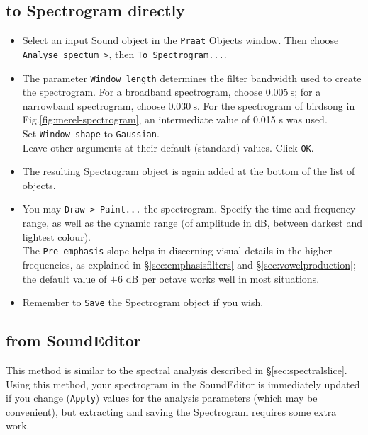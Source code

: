 \documentclass[
]{book}
\begin{document}
\subsection{to Spectrogram directly}\label{to-spectrogram-directly}

\begin{itemize}
\item
  Select an input Sound object in the \texttt{Praat} Objects window. Then choose \texttt{Analyse\ spectum\ \textgreater{}}, then \texttt{To\ Spectrogram...}.
\item
  The parameter \texttt{Window\ length} determines the filter bandwidth used to create the spectrogram. For a broadband spectrogram, choose \(0.005\ \textrm{s}\); for a narrowband spectrogram, choose \(0.030\ \textrm{s}\).
  For the spectrogram of birdsong in Fig.\ref{fig:merel-spectrogram}, an intermediate value of 0.015 s was used.\\
  Set \texttt{Window\ shape} to \texttt{Gaussian}.\\
  Leave other arguments at their default (standard) values. Click \texttt{OK}.
\item
  The resulting Spectrogram object is again added at the bottom of the list of objects.
\item
  You may \texttt{Draw\ \textgreater{}\ Paint...} the spectrogram. Specify the time and frequency range, as well as the dynamic range (of amplitude in dB, between darkest and lightest colour).\\
  The \texttt{Pre-emphasis} slope helps in discerning visual details in the higher frequencies, as explained in §\ref{sec:emphasisfilters} and §\ref{sec:vowelproduction}; the default value of \(+6\) dB per octave works well in most situations.
\item
  Remember to \texttt{Save} the Spectrogram object if you wish.
\end{itemize}

\subsection{from SoundEditor}\label{sec:spectrogramsoundeditor}

This method is similar to the spectral analysis described in §\ref{sec:spectralslice}. Using this method, your spectrogram in the SoundEditor is immediately updated if you change (\texttt{Apply}) values for the analysis parameters (which may be convenient), but extracting and saving the Spectrogram requires some extra work.
\end{document}
